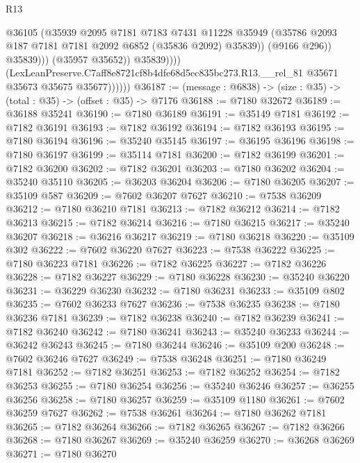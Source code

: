 \begin{lexlean}{R13}
\begin{coremodule}
                                @36105
                                (@35939
                                  @2095
                                  @7181
                                  @7183
                                  @7431
                                  @11228
                                  @35949
                                  (@35786 @2093 @187 @7181 @7181 @2092 @6852 (@35836 @2092) @35839))
                                (@9166 @296))
                              @35839)))
                        (@35957 @35652))
                      @35839))))
              (LexLeanPreserve.C7aff8e8721cf8b4dfe68d5ec835bc273.R13.__rel_81
                @35671
                @35673
                @35675
                @35677))))))
@36187 := (message : @6838) -> (size : @35) -> (total : @35) -> (offset : @35) -> @7176
@36188 := @7180 @32672
@36189 := @36188 @35241
@36190 := @7180 @36189
@36191 := @35149 @7181
@36192 := @7182 @36191
@36193 := @7182 @36192
@36194 := @7182 @36193
@36195 := @7180 @36194
@36196 := @35240 @35145
@36197 := @36195 @36196
@36198 := @7180 @36197
@36199 := @35114 @7181
@36200 := @7182 @36199
@36201 := @7182 @36200
@36202 := @7182 @36201
@36203 := @7180 @36202
@36204 := @35240 @35110
@36205 := @36203 @36204
@36206 := @7180 @36205
@36207 := @35109 @587
@36209 := @7602 @36207 @7627
@36210 := @7538 @36209
@36212 := @7180 @36210 @7181
@36213 := @7182 @36212
@36214 := @7182 @36213
@36215 := @7182 @36214
@36216 := @7180 @36215
@36217 := @35240 @36207
@36218 := @36216 @36217
@36219 := @7180 @36218
@36220 := @35109 @302
@36222 := @7602 @36220 @7627
@36223 := @7538 @36222
@36225 := @7180 @36223 @7181
@36226 := @7182 @36225
@36227 := @7182 @36226
@36228 := @7182 @36227
@36229 := @7180 @36228
@36230 := @35240 @36220
@36231 := @36229 @36230
@36232 := @7180 @36231
@36233 := @35109 @802
@36235 := @7602 @36233 @7627
@36236 := @7538 @36235
@36238 := @7180 @36236 @7181
@36239 := @7182 @36238
@36240 := @7182 @36239
@36241 := @7182 @36240
@36242 := @7180 @36241
@36243 := @35240 @36233
@36244 := @36242 @36243
@36245 := @7180 @36244
@36246 := @35109 @200
@36248 := @7602 @36246 @7627
@36249 := @7538 @36248
@36251 := @7180 @36249 @7181
@36252 := @7182 @36251
@36253 := @7182 @36252
@36254 := @7182 @36253
@36255 := @7180 @36254
@36256 := @35240 @36246
@36257 := @36255 @36256
@36258 := @7180 @36257
@36259 := @35109 @1180
@36261 := @7602 @36259 @7627
@36262 := @7538 @36261
@36264 := @7180 @36262 @7181
@36265 := @7182 @36264
@36266 := @7182 @36265
@36267 := @7182 @36266
@36268 := @7180 @36267
@36269 := @35240 @36259
@36270 := @36268 @36269
@36271 := @7180 @36270

\end{coremodule}
\end{lexlean}

